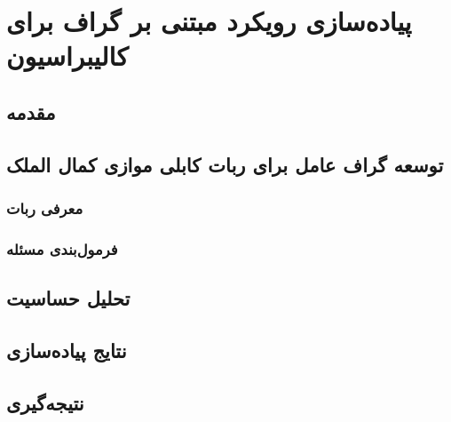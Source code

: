 \chapter{پیاده‌سازی رویکرد مبتنی بر گراف برای کالیبراسیون}

\section{مقدمه}

\section{توسعه گراف عامل برای ربات کابلی موازی کمال الملک}
\subsection{معرفی ربات}
\subsection{فرمول‌بندی مسئله}

\section{تحلیل حساسیت}

\section{نتایج پیاده‌سازی}

\section{نتیجه‌گیری}